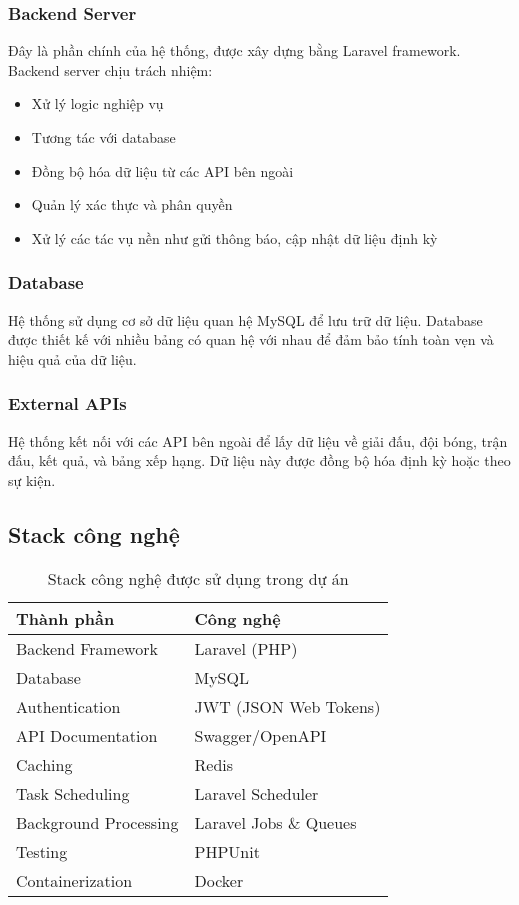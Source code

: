 \documentclass[a4paper,12pt]{report}
\begin{document}
\subsubsection{Backend Server}
Đây là phần chính của hệ thống, được xây dựng bằng Laravel framework. Backend server chịu trách nhiệm:
\begin{itemize}
    \item Xử lý logic nghiệp vụ
    \item Tương tác với database
    \item Đồng bộ hóa dữ liệu từ các API bên ngoài
    \item Quản lý xác thực và phân quyền
    \item Xử lý các tác vụ nền như gửi thông báo, cập nhật dữ liệu định kỳ
\end{itemize}

\subsubsection{Database}
Hệ thống sử dụng cơ sở dữ liệu quan hệ MySQL để lưu trữ dữ liệu. Database được thiết kế với nhiều bảng có quan hệ với nhau để đảm bảo tính toàn vẹn và hiệu quả của dữ liệu.

\subsubsection{External APIs}
Hệ thống kết nối với các API bên ngoài để lấy dữ liệu về giải đấu, đội bóng, trận đấu, kết quả, và bảng xếp hạng. Dữ liệu này được đồng bộ hóa định kỳ hoặc theo sự kiện.

\subsection{Stack công nghệ}

\begin{table}[h]
\centering
\begin{tabular}{|l|l|}
\hline
\textbf{Thành phần} & \textbf{Công nghệ} \\
\hline
Backend Framework & Laravel (PHP) \\
\hline
Database & MySQL \\
\hline
Authentication & JWT (JSON Web Tokens) \\
\hline
API Documentation & Swagger/OpenAPI \\
\hline
Caching & Redis \\
\hline
Task Scheduling & Laravel Scheduler \\
\hline
Background Processing & Laravel Jobs \& Queues \\
\hline
Testing & PHPUnit \\
\hline
Containerization & Docker \\
\hline
\end{tabular}
\caption{Stack công nghệ được sử dụng trong dự án}
\label{tab:tech-stack}
\end{table}
\end{document}
